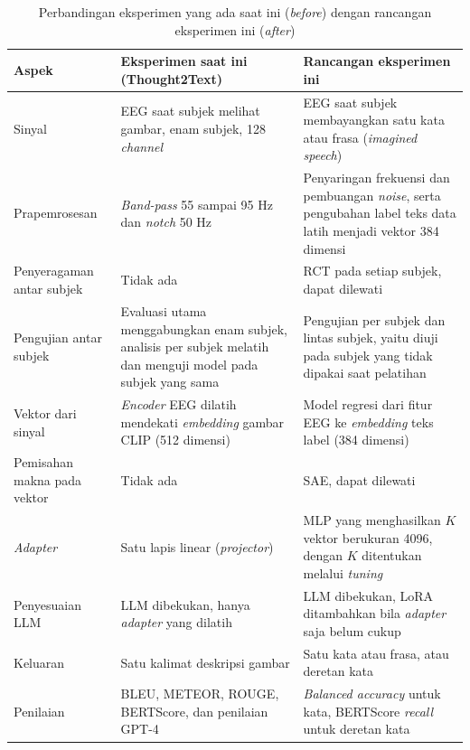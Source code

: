 \begin{table}[t]
  \centering
  \caption{Perbandingan eksperimen yang ada saat ini (\textit{before}) dengan rancangan eksperimen ini (\textit{after})}
  \label{tab:perbandingan}
  \footnotesize
  \begin{tabularx}{\textwidth}{| Z{0.17\textwidth} | Y | Y |}
    \hline
    Aspek & Eksperimen saat ini (Thought2Text) & Rancangan eksperimen ini \\
    \hline
    Sinyal & EEG saat subjek melihat gambar, enam subjek, 128 \textit{channel} & EEG saat subjek membayangkan satu kata atau frasa (\textit{imagined speech}) \\
    \hline
    Prapemrosesan & \textit{Band-pass} 55 sampai 95 Hz dan \textit{notch} 50 Hz & Penyaringan frekuensi dan pembuangan \textit{noise}, serta pengubahan label teks data latih menjadi vektor 384 dimensi \\
    \hline
    Penyeragaman antar subjek & Tidak ada & RCT pada setiap subjek, dapat dilewati \\
    \hline
    Pengujian antar subjek & Evaluasi utama menggabungkan enam subjek, analisis per subjek melatih dan menguji model pada subjek yang sama & Pengujian per subjek dan lintas subjek, yaitu diuji pada subjek yang tidak dipakai saat pelatihan \\
    \hline
    Vektor dari sinyal & \textit{Encoder} EEG dilatih mendekati \textit{embedding} gambar CLIP (512 dimensi) & Model regresi dari fitur EEG ke \textit{embedding} teks label (384 dimensi) \\
    \hline
    Pemisahan makna pada vektor & Tidak ada & SAE, dapat dilewati \\
    \hline
    \textit{Adapter} & Satu lapis linear (\textit{projector}) & MLP yang menghasilkan $K$ vektor berukuran 4096, dengan $K$ ditentukan melalui \textit{tuning} \\
    \hline
    Penyesuaian LLM & LLM dibekukan, hanya \textit{adapter} yang dilatih & LLM dibekukan, LoRA ditambahkan bila \textit{adapter} saja belum cukup \\
    \hline
    Keluaran & Satu kalimat deskripsi gambar & Satu kata atau frasa, atau deretan kata \\
    \hline
    Penilaian & BLEU, METEOR, ROUGE, BERTScore, dan penilaian GPT-4 & \textit{Balanced accuracy} untuk kata, BERTScore \textit{recall} untuk deretan kata \\
    \hline
  \end{tabularx}
\end{table}

